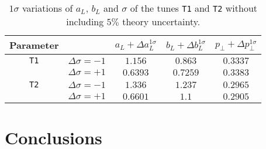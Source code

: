 \documentclass[aps,preprint,floatfix,nofootinbib,showpacs]{revtex4-1}
\begin{document}
\begin{table}[!h]
 \begin{center}
 \begin{tabular}{ c | c | c | c | c  }
 \hline \hline
  Parameter   & & \hspace{0.4cm} $a_L + \Delta a_L^{1\sigma}$ \hspace{0.4cm}   & \hspace{0.4cm} $b_L + \Delta b_L^{1\sigma}$ \hspace{0.4cm} & \hspace{0.4cm} $p_\perp + \Delta p_\perp^{1\sigma}$ \hspace{0.4cm} \\ \hline \hline
  \texttt{T1} & $\Delta\sigma=-1$ \hspace{0.5cm}  & $1.156$   & $0.863$  & $0.3337$ \\ 
              & $\Delta\sigma=+1$ \hspace{0.5cm}  & $0.6393$  & $0.7259$ & $0.3383$ \\ \hline \hline
  \texttt{T2} & $\Delta\sigma=-1$ \hspace{0.5cm}  & $1.336$   & $1.237$  & $0.2965$ \\ 
              & $\Delta\sigma=+1$ \hspace{0.5cm}  & $0.6601$  & $1.1$    & $0.2905$ \\ \hline \hline
 \end{tabular}
 \end{center}
 \caption{$1\sigma$ variations of $a_L$, $b_L$ and $\sigma$ of the tunes \texttt{T1} and \texttt{T2} without
 including $5\%$ theory uncertainty.}
 \label{Table.variations_without-uncertainty}
\end{table}

\clearpage

\section{Conclusions}

\appendix
\end{document}
